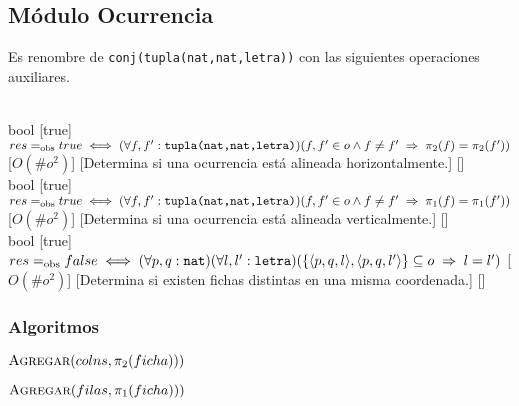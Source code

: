 \subsection{Módulo Ocurrencia}
Es renombre de \texttt{conj(tupla(nat,nat,letra))} con las siguientes operaciones auxiliares.\\\\
\begin{operaciones}
  {
  }{bool}
  [true]
  {$res\igobs true\iff(\forall f,f':\texttt{tupla(nat,nat,letra)})(f,f'\in o\land f\neq f'\implies \pi_{2}(f)=\pi_{2}(f'))$}
  [$O(\#o^{2})$]
  [Determina si una ocurrencia está alineada horizontalmente.]
  [\falta]\\

  \noindent{}
  {
  }{bool}
  [true]
  {$res\igobs true\iff(\forall f,f':\texttt{tupla(nat,nat,letra)})(f,f'\in o\land f\neq f'\implies \pi_{1}(f)=\pi_{1}(f'))$}
  [$O(\#o^{2})$]
  [Determina si una ocurrencia está alineada verticalmente.]
  [\falta]\\

  \noindent{}
  {
  }{bool}
  [true]
  {$res\igobs false\iff
      (\forall p,q:\texttt{nat})(\forall l,l':\texttt{letra})(
      \{\langle p,q,l\rangle,\langle p,q,l'\rangle\}\subseteq o\implies l=l')$}
  [$O(\#o^{2})$]
  [Determina si existen fichas distintas en una misma coordenada.]
  [\falta]
\end{operaciones}

\subsubsection*{Algoritmos}
\begin{algorithm}[H]
  \begin{algorithmic}[1]
    \State{}
      \State{}
      \State$\textsc{Agregar}(colns,\pi_{2}(ficha)))$
    \EndFor
    \State{}
  \end{algorithmic}
\end{algorithm}

\begin{algorithm}[H]
  \begin{algorithmic}[1]
    \State{}
      \State{}
      \State$\textsc{Agregar}(filas,\pi_{1}(ficha)))$
    \EndFor
    \State{}
  \end{algorithmic}
\end{algorithm}

